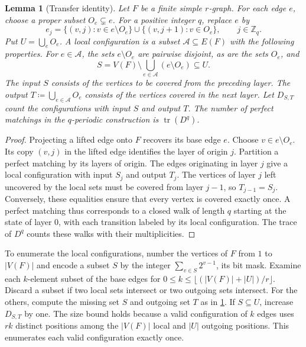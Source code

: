 \documentclass[10pt]{article}
\numberwithin{equation}{section}
\newtheorem{lemma}[lemma]{Lemma}\aliascntresetthe{lemma}
\begin{document}
\begin{lemma}[Transfer identity]\label{finite:lem:transfer}
Let $F$ be a finite simple $r$-graph. For each edge $e$, choose a proper
subset $O_e\subsetneq e$. For a positive integer $q$, replace $e$ by
\[
 e_j=\{(v,j):v\in e\setminus O_e\}\cup
      \{(v,j+1):v\in O_e\},\qquad j\in\mathbb Z_q.
\]
Put $U=\bigcup_e O_e$. A \emph{local configuration} is a subset $\mathcal A\subseteq E(F)$ with the following properties. For $e\in\mathcal A$, the sets $e\setminus O_e$ are pairwise disjoint, as are the sets $O_e$, and
\[
 S=V(F)\setminus\bigcup_{e\in\mathcal A}(e\setminus O_e)\subseteq U.
\]
The input $S$ consists of the vertices to be covered from the preceding layer. The output $T\coloneqq\bigcup_{e\in\mathcal A}O_e$ consists of the vertices covered in the next layer. Let $D_{S,T}$ count the configurations with input $S$ and output $T$. The number of perfect matchings in the $q$-periodic construction is $\operatorname{tr}(D^q)$.
\end{lemma}
\begin{proof}
Projecting a lifted edge onto $F$ recovers its base edge $e$. Choose $v\in e\setminus O_e$. Its copy $(v,j)$ in the lifted edge identifies the layer of origin $j$. Partition a perfect matching by its layers of origin. The edges originating in layer $j$ give a local configuration with input $S_j$ and output $T_j$. The vertices of layer $j$ left uncovered by the local sets must be covered from layer $j-1$, so $T_{j-1}=S_j$. Conversely, these equalities ensure that every vertex is covered exactly once. A perfect matching thus corresponds to a closed walk of length $q$ starting at the state of layer 0, with each transition labeled by its local configuration. The trace of $D^q$ counts these walks with their multiplicities.
\end{proof}

To enumerate the local configurations, number the vertices of $F$ from $1$ to $|V(F)|$ and encode a subset $S$ by the integer $\sum_{v\in S}2^{v-1}$, its bit mask. Examine each $k$-element subset of the base edges for $0\le k\le\lfloor(|V(F)|+|U|)/r\rfloor$. Discard a subset if two local sets intersect or two outgoing sets intersect. For the others, compute the missing set $S$ and outgoing set $T$ as in \cref{finite:lem:transfer}. If $S\subseteq U$, increase $D_{S,T}$ by one. The size bound holds because a valid configuration of $k$ edges uses $rk$ distinct positions among the $|V(F)|$ local and $|U|$ outgoing positions. This enumerates each valid configuration exactly once.
\end{document}
